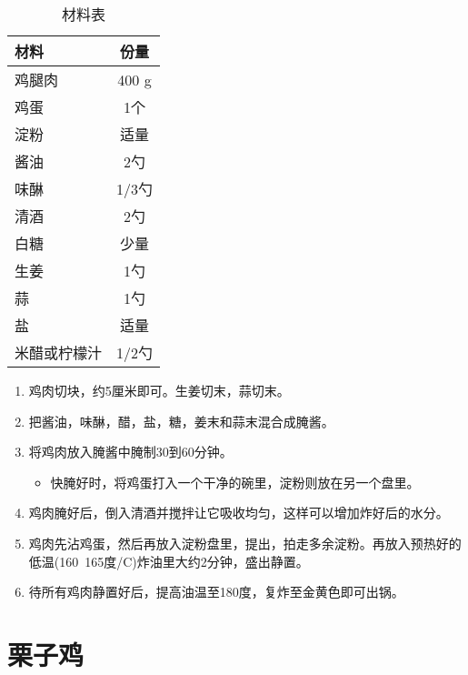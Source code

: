 \begin{table}[H]
    \centering
    \begin{tabular}{|l||c|}\hline
     \textbf{材料}    &  \textbf{份量}\\ \hline\hline
    鸡腿肉    &  400 g  \\ \hline
    鸡蛋     &  1个\\ \hline
    淀粉     &  适量 \\ \hline
    酱油     & 2勺  \\ \hline
    味醂     & 1/3勺  \\ \hline
    清酒     & 2勺  \\ \hline
    白糖     & 少量  \\ \hline
    生姜     & 1勺  \\ \hline
    蒜     & 1勺  \\ \hline
    盐     &  适量 \\ \hline
    米醋或柠檬汁     & 1/2勺 \\ \hline
    \end{tabular}
    \caption{材料表}
\end{table}


\begin{enumerate}
    \item 鸡肉切块，约5厘米即可。生姜切末，蒜切末。
 
    \item 把酱油，味醂，醋，盐，糖，姜末和蒜末混合成腌酱。
  
    \item 将鸡肉放入腌酱中腌制30到60分钟。
    \begin{itemize}
        \item 快腌好时，将鸡蛋打入一个干净的碗里，淀粉则放在另一个盘里。
    \end{itemize}
    \item 鸡肉腌好后，倒入清酒并搅拌让它吸收均匀，这样可以增加炸好后的水分。
    \item 鸡肉先沾鸡蛋，然后再放入淀粉盘里，提出，拍走多余淀粉。再放入预热好的低温(160~165度/C)炸油里大约2分钟，盛出静置。
    \item 待所有鸡肉静置好后，提高油温至180度，复炸至金黄色即可出锅。
\end{enumerate}


\section{栗子鸡}

